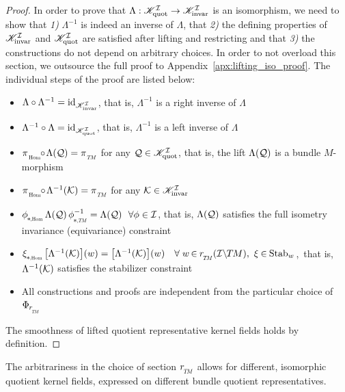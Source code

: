 \begin{proof}
    In order to prove that $\Lambda: \mathscr{K}_\textup{quot}^{\mathcal{I}} \to \mathscr{K}_\textup{invar}^{\mathcal{I}}$ is an isomorphism, we need to show that
    \textit{1)} $\Lambda^{-1}$ is indeed an inverse of $\Lambda$, that
    \textit{2)} the defining properties of $\mathscr{K}_\textup{invar}^{\mathcal{I}}$ and $\mathscr{K}_\textup{quot}^{\mathcal{I}}$ are satisfied after lifting and restricting and that
    \textit{3)} the constructions do not depend on arbitrary choices.
    In order to not overload this section, we outsource the full proof to Appendix~\ref{apx:lifting_iso_proof}.
    The individual steps of the proof are listed below:
    \begin{itemize}[leftmargin=1.25cm]
        \item[\it 1\hspace{1pt}a)] $\Lambda \circ \Lambda^{-1} = \mathrm{id}_{\mathscr{K}_\textup{invar}^{\mathcal{I}}}$,
            that is, $\Lambda^{-1}$ is a right inverse of $\Lambda$
        \item[\it 1\hspace{1pt}b)] $\Lambda^{-1} \circ \Lambda = \mathrm{id}_{\mathscr{K}_\textup{quot}^{\mathcal{I}}}$,
            that is, $\Lambda^{-1}$ is a left inverse of $\Lambda$
        \item[\it 2\hspace{1pt}a)] $\piHom \mkern-5mu\circ\mkern-2mu \Lambda(\Q) = \piTM$ for any $\mathcal{Q} \in \mathscr{K}_\textup{quot}^{\mathcal{I}}$,
            that is, the lift $\Lambda(\mathcal{Q})$ is a bundle $M$-morphism
        \item[\it 2\hspace{1pt}b)] ${\piHom \mkern-5mu\circ\mkern-2mu \Lambda^{-1}(\K) = \piTM}$ for any $\mathcal{K} \in \mathscr{K}_\textup{invar}^{\mathcal{I}}$
        \item[\it 2\hspace{1pt}c)] $\dphiHom \Lambda(\Q)\, \dphiTMinv = \Lambda(\Q)\ \ \forall \phi \in \I$,
            that is, $\Lambda(\mathcal{Q})$ satisfies the full isometry invariance (equivariance) constraint
        \item[\it 2\hspace{1pt}d)] $\dxiHom \big[\Lambda^{-1}(\K)\big](w) = \big[\Lambda^{-1}(\K)\big](w) \ \ \
               \forall\; w \mkern-2mu\in\mkern-1mu \rTM(\ITM),\ \xi \mkern-1mu\in\mkern-1mu \Stab{w}$,\ 
            that is, $\Lambda^{-1}(\mathcal{K})$ satisfies the stabilizer constraint
        \item[\it 3)] All constructions and proofs are independent from the particular choice of $\PhirNoArg$
    \end{itemize}
    The smoothness of lifted quotient representative kernel fields holds by definition.
\end{proof}
The arbitrariness in the choice of section $\rTM$ allows for different, isomorphic quotient kernel fields, expressed on different bundle quotient representatives.


